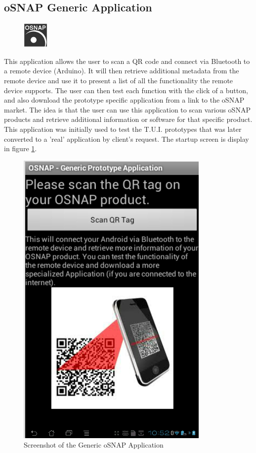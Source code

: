 \subsection{oSNAP Generic Application} \label{section:app-generic}
\begin{figure}
	\centering \includegraphics[scale=1]{img/app-generic}
\end{figure}
This application allows the user to scan a QR code and connect via Bluetooth to a remote device (Arduino).
It will then retrieve additional metadata from the remote device and use it to present a list of all the
functionality the remote device supports. The user can then test each function with the click of a button,
and also download the prototype specific application from a link to the oSNAP market.
The idea is that the user can use this application to scan various oSNAP products and retrieve
additional information or software for that specific product. This application was initially used to test
the T.U.I. prototypes that was later converted to a 'real' application by client's request. The startup screen
is display in figure \ref{fig:osnap-generic}.

\begin{figure}[h!]
	\centering \includegraphics[scale=0.4]{img/osnap-generic}
	\caption{Screenshot of the Generic oSNAP Application}
	\label{fig:osnap-generic}
\end{figure}

